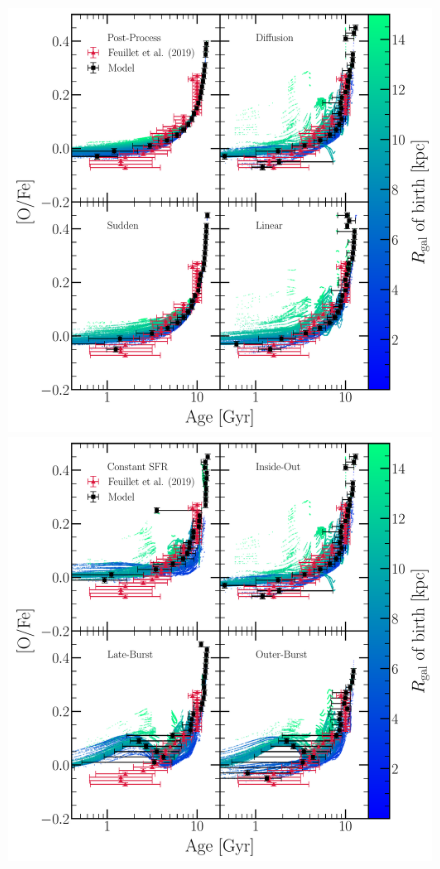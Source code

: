 \documentclass[fleqn, usenatbib]{mnras}
\begin{document}
\begin{figure} 
\centering 
\includegraphics[scale = 0.34]{age_ofe_migration_comparison.pdf} 
\includegraphics[scale = 0.34]{age_ofe_sfh_comparison.pdf} 

\end{figure}
\end{document}

